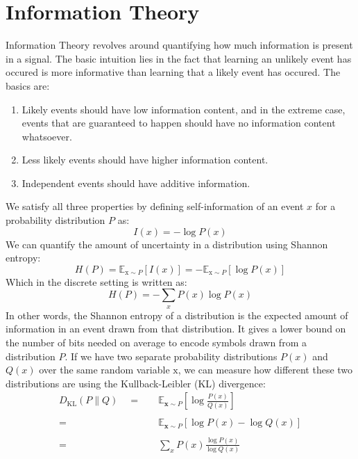 \documentclass[twoside,twocolumn]{article}
\begin{document}
\section{Information Theory}
Information Theory revolves around quantifying how much information is present
in a signal. The basic intuition lies in the fact that learning an unlikely
event has occured is more informative than learning that a likely event has
occured. The basics are:
\begin{enumerate}
  \item Likely events should have low information content, and in the extreme
  case, events that are guaranteed to happen should have no information content
  whatsoever.
  \item Less likely events should have higher information content.
  \item Independent events should have additive information.
\end{enumerate}
We satisfy all three properties by defining self-information of an event $x$
for a probability distribution $P$ as:
\begin{equation}
  I(x) = -\log P(x)
\end{equation}
We can quantify the amount of uncertainty in a
distribution using Shannon entropy:
\begin{equation}
  H ( P ) = \mathbb { E } _ { \mathrm { x } \sim P } [ I ( x ) ] = - \mathbb { E } _ { \mathrm { x } \sim P } [ \log P ( x ) ]
\end{equation}
Which in the discrete setting is written as:
\begin{equation}
  H ( P ) = -\sum_{x} P(x) \log P(x)
\end{equation}
In other words, the Shannon entropy of a distribution is the expected amount
of information in an event drawn from that distribution. It gives a lower bound
on the number of bits needed on average to encode symbols drawn
from a distribution $P$. If we have two separate probability distributions
$P(x)$ and $Q(x)$ over the same random variable $\mathrm{x}$, we can measure how
different these two distributions are using the Kullback-Leibler (KL)
divergence:
\begin{equation}
  \begin{split}
    D _ { \mathrm { KL } } ( P \| Q ) \quad =& \quad \mathbb { E } _ { \mathbf { x } \sim P } \left[ \log \frac { P ( x ) } { Q ( x ) } \right]\\
    \\
    =& \quad \mathbb { E } _ { \mathbf { x } \sim P } \left[ \log P ( x ) - \log Q ( x ) \right] \\
    \\
    =& \quad \sum_x P(x) \frac{\log P(x)}{\log Q(x)} \\
  \end{split}
\end{equation}
\end{document}
